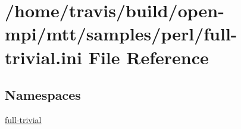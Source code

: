 \hypertarget{full-trivial_8ini}{\section{/home/travis/build/open-\/mpi/mtt/samples/perl/full-\/trivial.ini File Reference}
\label{full-trivial_8ini}
}
\subsection*{Namespaces}
\begin{DoxyCompactItemize}
\item 
\hyperlink{namespacefull-trivial}{full-\/trivial}
\end{DoxyCompactItemize}
